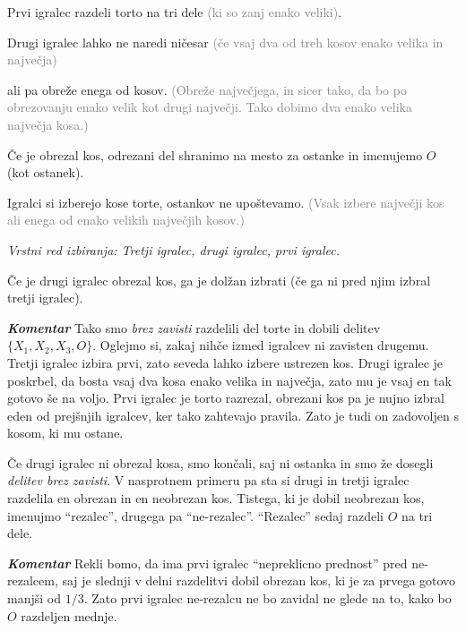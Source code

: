 \documentclass[a4paper,12pt]{article}
\begin{document}
\begin{protokol}

\item Prvi igralec razdeli torto na tri dele \textcolor{gray}{(ki so zanj enako veliki)}.

\item Drugi igralec lahko ne naredi ničesar \textcolor{gray}{(če vsaj dva od treh kosov enako velika in največja)}

ali pa obreže enega od kosov. \textcolor{gray}{(Obreže največjega, in sicer tako, da bo po obrezovanju enako velik kot drugi največji. Tako dobimo dva enako velika največja kosa.)}

Če je obrezal kos, odrezani del shranimo na mesto za ostanke in imenujemo $O$ (kot ostanek).

\item Igralci si izberejo kose torte, ostankov ne upoštevamo. \textcolor{gray}{(Vsak izbere največji kos ali enega od enako velikih največjih kosov.)}

\textsl{Vrstni red izbiranja: Tretji igralec, drugi igralec, prvi igralec.}

Če je drugi igralec obrezal kos, ga je dolžan izbrati (če ga ni pred njim izbral tretji igralec).

\item [\textbf{\em Komentar}] Tako smo {\em brez zavisti} razdelili del torte in dobili delitev ${\{X_1, X_2, X_3, O\}}$. Oglejmo si, zakaj nihče izmed igralcev ni zavisten drugemu. Tretji igralec izbira prvi, zato seveda lahko izbere ustrezen kos. Drugi igralec je poskrbel, da bosta vsaj dva kosa enako velika in največja, zato mu je vsaj en tak gotovo še na voljo. Prvi igralec je torto razrezal, obrezani kos pa je nujno izbral eden od prejšnjih igralcev, ker tako zahtevajo pravila. Zato je tudi on zadovoljen s kosom, ki mu ostane.

\item Če drugi igralec ni obrezal kosa, smo končali, saj ni ostanka in smo že dosegli {\em delitev brez zavisti}. V nasprotnem primeru pa sta si drugi in tretji igralec razdelila en obrezan in en neobrezan kos. Tistega, ki je dobil neobrezan kos, imenujmo ``rezalec'', drugega pa ``ne-rezalec''. ``Rezalec'' sedaj razdeli $O$ na tri dele.

\item [\textbf{\em Komentar}] Rekli bomo, da ima prvi igralec ``nepreklicno prednost'' pred ne-rezalcem, saj je slednji v delni razdelitvi dobil obrezan kos, ki je za prvega gotovo manjši od $1/3$. Zato prvi igralec ne-rezalcu ne bo zavidal ne glede na to, kako bo $O$ razdeljen mednje.


\end{protokol}
\end{document}
